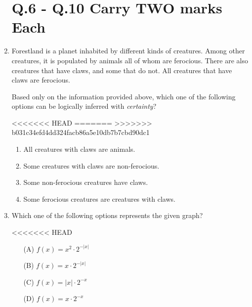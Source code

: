 \documentclass[journal]{IEEEtran}
\begin{document}
\begin{enumerate}
\section*{Q.6 - Q.10 Carry TWO marks Each}

\item 
Forestland is a planet inhabited by different kinds of creatures. Among other creatures, it is populated by animals all of whom are ferocious. There are also creatures that have claws, and some that do not. All creatures that have claws are ferocious.



Based only on the information provided above, which one of the following options can be logically inferred with \textit{certainty}?

<<<<<<< HEAD
\hfill{}
=======
\hfill{}
>>>>>>> b031c34efd4dd324facb86a5e10db7b7cbd90dc1

\begin{enumerate}
    \item All creatures with claws are animals.
    \item Some creatures with claws are non-ferocious.
    \item Some non-ferocious creatures have claws.
    \item Some ferocious creatures are creatures with claws.
\end{enumerate}

\item 
Which one of the following options represents the given graph?

<<<<<<< HEAD
\hfill{}

\begin{center}
\end{center}

\begin{enumerate}
    \item[(A)] \( f(x) = x^2 \cdot 2^{-|x|} \)
    \item[(B)] \( f(x) = x \cdot 2^{-|x|} \)
    \item[(C)] \( f(x) = |x| \cdot 2^{-x} \)
    \item[(D)] \( f(x) = x \cdot 2^{-x} \)
     \end{enumerate}
     \hfill{}
     

\end{enumerate}
\end{document}
